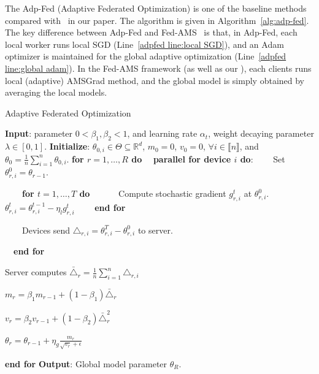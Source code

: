\documentclass[nohyperref]{article}
\begin{document}
The Adp-Fed (Adaptive Federated Optimization) is one of the baseline methods compared with \algo\ in our paper. The algorithm is given in Algorithm~\ref{alg:adp-fed}. The key difference between Adp-Fed and Fed-AMS~\citep{chen2020toward} is that, in Adp-Fed, each local worker runs local SGD (Line~\ref{adpfed line:local SGD}), and an Adam optimizer is maintained for the global adaptive optimization (Line~\ref{adpfed line:global adam}). In the Fed-AMS framework (as well as our \algo), each clients runs local (adaptive) AMSGrad method, and the global model is simply obtained by averaging the local models.


\begin{algorithm}[H]
\caption{Adaptive Federated Optimization~\citep{reddi2020adaptive}} \label{alg:adp-fed}
\begin{algorithmic}[1]
\STATE \textbf{Input}: parameter $0< \beta_1, \beta_2 <1$, and learning rate $\alpha_t$, weight decaying parameter $\lambda \in [0,1]$.
\STATE \textbf{Initialize}: $\theta_{0,i} \in \Theta \subseteq \mathbb R^d $, $m_0=0$, $v_{0} =0$, $\forall i\in \llbracket n\rrbracket$, and $\theta_0 =  \frac{1}{n} \sum_{i=1}^n \theta_{0,i}$.
\vspace{0.05in}
\STATE \textbf{for $r=1, \ldots, R$ do}
\STATE $\quad$\textbf{parallel for device $i$ do}:
\STATE $\qquad$Set $\theta_{r,i}^{0} = \theta_{r-1}$.

\STATE $\qquad$\textbf{for $t=1, \ldots, T$ do}
\STATE $\qquad\quad$Compute stochastic gradient $g^t_{r,i}$ at $\theta_{r,i}^{0}$.
\STATE $\qquad\quad$$\theta_{r,i}^t=\theta_{r,i}^{t-1}-\eta_l g_{r,i}^t$ \label{adpfed line:local SGD} 
\STATE $\qquad$\textbf{end for}


\STATE $\qquad$Devices send $\triangle_{r,i}=\theta_{r,i}^T-\theta_{r,i}^0$ to server.

\STATE $\quad$\textbf{end for}

\STATE \quad Server computes $\bar{\triangle}_r = \frac{1}{n}\sum_{i=1}^n \triangle_{r,i}$

\STATE \quad $m_r = \beta_1 m_{r-1} + (1-\beta_1)\bar{\triangle}_r$

\STATE \quad $v_r = \beta_2 v_{r-1} + (1-\beta_2)\bar{\triangle}_r^2$

\STATE \quad $\theta_r = \theta_{r-1}+\eta_g\frac{m_r}{\sqrt{v_r}+\epsilon}$ \label{adpfed line:global adam}

\STATE \textbf{end for}
\STATE \textbf{Output}: Global model parameter $\theta_R$.
\end{algorithmic}
\end{algorithm}
\end{document}
